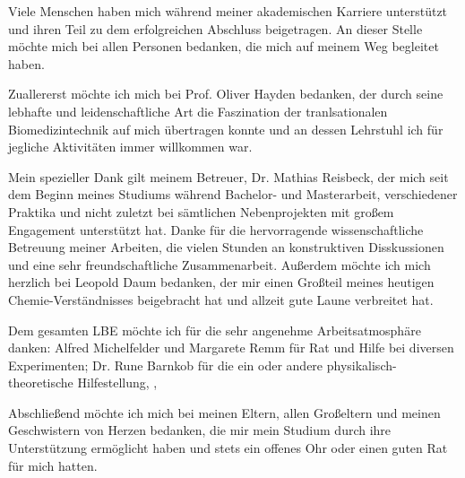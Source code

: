 Viele Menschen haben mich während meiner akademischen Karriere unterstützt und ihren Teil zu dem erfolgreichen Abschluss beigetragen.  An dieser Stelle möchte mich bei allen Personen bedanken, die mich auf meinem Weg begleitet haben.

Zuallererst möchte ich mich bei Prof. Oliver Hayden bedanken, der durch seine lebhafte und leidenschaftliche Art die Faszination der tranlsationalen Biomedizintechnik auf mich übertragen konnte und an dessen Lehrstuhl ich für jegliche Aktivitäten immer willkommen war.

Mein spezieller Dank gilt meinem Betreuer, Dr. Mathias Reisbeck, der mich seit dem Beginn meines Studiums während Bachelor- und Masterarbeit, verschiedener Praktika und nicht zuletzt bei sämtlichen Nebenprojekten mit großem   Engagement unterstützt hat. Danke für die hervorragende wissenschaftliche Betreuung meiner Arbeiten, die vielen Stunden an konstruktiven Disskussionen und eine sehr freundschaftliche Zusammenarbeit. Außerdem möchte ich mich herzlich bei Leopold Daum bedanken, der mir einen Großteil meines heutigen Chemie-Verständnisses beigebracht hat und allzeit gute Laune verbreitet hat.

Dem gesamten LBE möchte ich für die sehr angenehme Arbeitsatmosphäre danken: Alfred Michelfelder und Margarete Remm für Rat und Hilfe bei diversen Experimenten; Dr. Rune Barnkob für die ein oder andere physikalisch-theoretische Hilfestellung, , 

Abschließend möchte ich mich bei meinen Eltern, allen Großeltern und meinen Geschwistern von Herzen bedanken, die mir mein Studium durch ihre Unterstützung ermöglicht haben und stets ein offenes Ohr oder einen guten Rat für mich hatten.